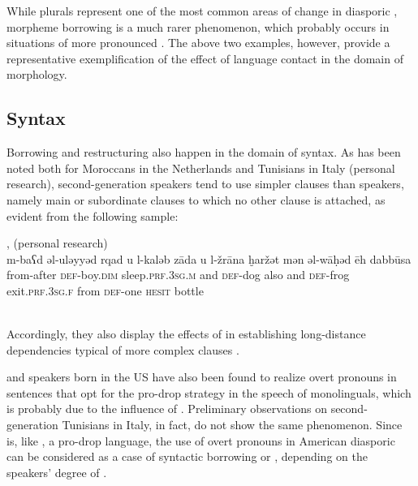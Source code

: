 \documentclass[output=paper]{langsci/langscibook}
\begin{document}
While plurals represent one of the most common areas of change in diasporic , morpheme borrowing is a much rarer phenomenon, which probably occurs in situations of more pronounced . The above two examples, however, provide a representative exemplification of the effect of language contact in the domain of morphology.


 
 \subsection{Syntax}


Borrowing and restructuring also happen in the domain of syntax. As has been noted both for Moroccans in the Netherlands \citep[99]{deRuiter1989} and Tunisians in Italy (personal research), second-generation speakers tend to use simpler clauses than  speakers, namely main or subordinate clauses to which no other clause is attached, as evident from the following sample:


\ea
{ ,  (personal research)}\\
\gll m-baʕd əl-uləyyəd rqad u l-kaləb zāda u l-žrāna ḫaržət mən əl-wāḥəd ēh dabbūsa\\
 from-after \textsc{def}-boy.\textsc{dim} sleep\textsc{.prf.3sg.m} and \textsc{def-}dog also and \textsc{def-}frog exit\textsc{.prf.3sg.f} from \textsc{def-}one \textsc{hesit} bottle\\
\\
\z

Accordingly, they also display the effects of  in establishing long-distance dependencies typical of more complex clauses \citep[305]{Albirini2016}.

 and  speakers born in the US have also been found to realize overt pronouns in sentences that opt for the pro-drop strategy in the speech of monolinguals, which is probably due to the influence of  \citep[283]{AlbiriniSaadah2014}. Preliminary observations on second-generation Tunisians in Italy, in fact, do not show the same phenomenon. Since  is, like , a pro-drop language, the use of overt pronouns in American diasporic  can be considered as a case of syntactic borrowing or  \citep{Lucas2015}, depending on the speakers’ degree of .
\end{document}
